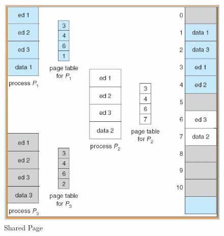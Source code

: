 \documentclass[12pt]{article}
\begin{document}
\begin{figure}[h]
  \centering
  \includegraphics[width=0.8\linewidth]{images/shared_page.png}
  \caption{Shared Page}
  \label{fig:shared_page}
\end{figure}
\end{document}
